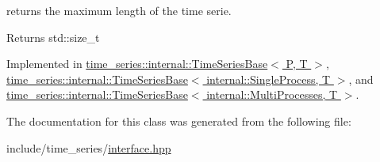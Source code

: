 returns the maximum length of the time serie. 

\begin{DoxyReturn}{Returns}
std\+::size\+\_\+t 
\end{DoxyReturn}


Implemented in \hyperlink{classtime__series_1_1internal_1_1TimeSeriesBase_aee1bf636a094a3068f9de731688c3972}{time\+\_\+series\+::internal\+::\+Time\+Series\+Base$<$ P, T $>$}, \hyperlink{classtime__series_1_1internal_1_1TimeSeriesBase_aee1bf636a094a3068f9de731688c3972}{time\+\_\+series\+::internal\+::\+Time\+Series\+Base$<$ internal\+::\+Single\+Process, T $>$}, and \hyperlink{classtime__series_1_1internal_1_1TimeSeriesBase_aee1bf636a094a3068f9de731688c3972}{time\+\_\+series\+::internal\+::\+Time\+Series\+Base$<$ internal\+::\+Multi\+Processes, T $>$}.



The documentation for this class was generated from the following file\+:\begin{DoxyCompactItemize}
\item 
include/time\+\_\+series/\hyperlink{interface_8hpp}{interface.\+hpp}\end{DoxyCompactItemize}
